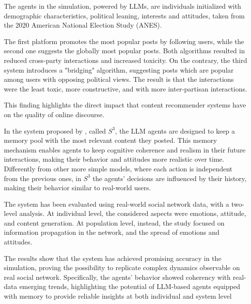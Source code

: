 The agents in the simulation, powered by LLMs, are individuals initialized with demographic characteristics, political leaning, interests and attitudes, taken from the 2020 American National Election Study (ANES).

The first platform promotes the most popular posts by following users, while the second one suggests the globally most popular posts. Both algorithms resulted in reduced cross-party interactions and increased toxicity.
On the contrary, the third system introduces a "bridging" algorithm, suggesting posts which are popular among users with opposing political views. The result is that the interactions were the least toxic, more constructive, and with more inter-partisan interactions.

This finding highlights the direct impact that content recommender systems have on the quality of online discourse.

\medskip
In the system proposed by \citet{gao2023s3socialnetworksimulationlarge}, called $S^3$, the LLM agents are designed to keep a memory pool with the most relevant content they posted. 
This memory mechanism enables agents to keep  cognitive coherence and realism in their future interactions, making their behavior and attitudes more realistic over time.
Differently from other more simple models, where each action is independent from the previous ones, in $S^3$ the agents' decisions are influenced by their history, making their behavior similar to real-world users.

The system has been evaluated using real-world social network data, with a two-level analysis.
At individual level, the considered aspects were emotions, attitude, and content generation. At population level, instead, the study focused on information propagation in the network, and the spread of emotions and attitudes.

The results show that the system has achieved promising accuracy in the simulation, proving the possibility to replicate complex dynamics observable on real social network.
Specifically, the agents' behavior showed coherency with real-data emerging trends, highlighting the potential of LLM-based agents equipped with memory to provide reliable insights at both individual and system level


